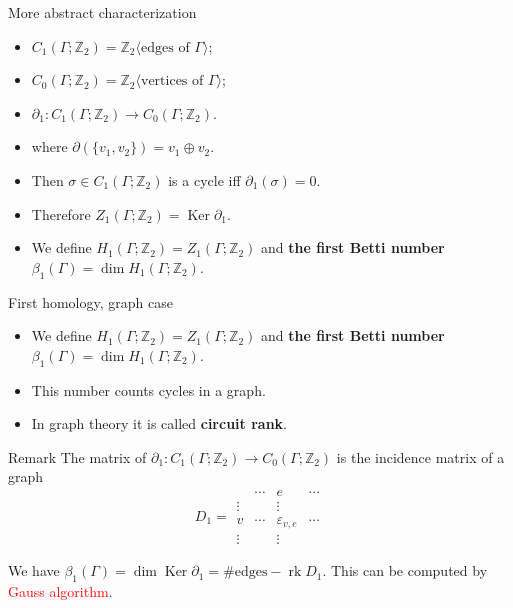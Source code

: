 \documentclass[10pt]{beamer}
\DeclareMathOperator{\Ker}{Ker}
\DeclareMathOperator{\rk}{rk}
\newcommand{\Zo}{\mathbb{Z}}
\newcommand{\Zt}{\Zo_2}
\newcommand{\dd}{\partial}
\begin{document}
\begin{frame}{More abstract characterization}

\begin{itemize}
  \item $C_1(\Gamma;\Zt)=\Zt\langle\mbox{edges of }\Gamma\rangle$;
  \item $C_0(\Gamma;\Zt)=\Zt\langle\mbox{vertices of }\Gamma\rangle$;
  \item $\dd_1\colon C_1(\Gamma;\Zt)\to C_0(\Gamma;\Zt)$.
  \item where $\dd(\{v_1,v_2\})=v_1\oplus v_2$.
  \item Then $\sigma\in C_1(\Gamma;\Zt)$ is a cycle iff $\dd_1(\sigma)=0$.
  \item Therefore $Z_1(\Gamma;\Zt)=\Ker\dd_1$.
  \item We define $H_1(\Gamma;\Zt)=Z_1(\Gamma;\Zt)$ and \textbf{the first Betti number} $\beta_1(\Gamma)=\dim H_1(\Gamma;\Zt)$.
\end{itemize}

\end{frame}

\begin{frame}{First homology, graph case}

\begin{itemize}
  \item We define $H_1(\Gamma;\Zt)=Z_1(\Gamma;\Zt)$ and \textbf{the first Betti number} $\beta_1(\Gamma)=\dim H_1(\Gamma;\Zt)$.
  \item This number counts cycles in a graph.
  \item In graph theory it is called \textbf{circuit rank}.
\end{itemize}

\begin{block}{Remark}
The matrix of $\dd_1\colon C_1(\Gamma;\Zt)\to C_0(\Gamma;\Zt)$ is the incidence matrix of a graph
\[
D_1=\begin{array}{c|ccc}
& \cdots  & e & \cdots \\
\hline
\vdots &  & \vdots &  \\
v & \cdots & \varepsilon_{v,e} & \cdots  \\
\vdots &  & \vdots &
\end{array}
\]
\end{block}

We have $\beta_1(\Gamma)=\dim\Ker\dd_1=\#\mbox{edges}-\rk D_1$. This can be computed by \textcolor{red}{Gauss algorithm}.

\end{frame}
\end{document}
